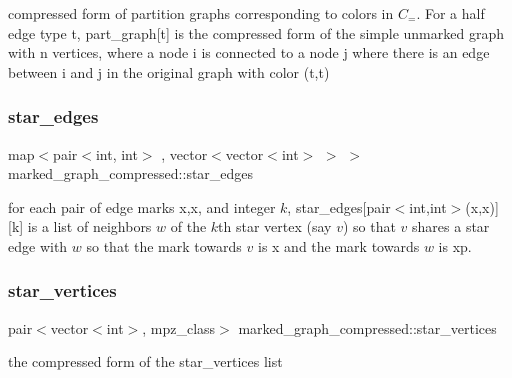 compressed form of partition graphs corresponding to colors in $C_=$. For a half edge type t, part\+\_\+graph\mbox{[}t\mbox{]} is the compressed form of the simple unmarked graph with n vertices, where a node i is connected to a node j where there is an edge between i and j in the original graph with color (t,t) 

\mbox{\label{classmarked__graph__compressed_a7df5779d313486644132bd816937f532}} 
\subsubsection{\texorpdfstring{star\+\_\+edges}{star\_edges}}
{\footnotesize\ttfamily map$<$pair$<$int, int$>$ , vector$<$vector$<$int$>$ $>$ $>$ marked\+\_\+graph\+\_\+compressed\+::star\+\_\+edges}



for each pair of edge marks x,x\textquotesingle{}, and integer $k$, star\+\_\+edges\mbox{[}pair$<$int,int$>$(x,x\textquotesingle{})\mbox{]}\mbox{[}k\mbox{]} is a list of neighbors $w$ of the $k$th star vertex (say $v$) so that $v$ shares a star edge with $w$ so that the mark towards $v$ is x and the mark towards $w$ is xp. 

\mbox{\label{classmarked__graph__compressed_a7a4ced4586e2e353f9076bd447df5208}} 
\subsubsection{\texorpdfstring{star\+\_\+vertices}{star\_vertices}}
{\footnotesize\ttfamily pair$<$vector$<$int$>$, mpz\+\_\+class$>$ marked\+\_\+graph\+\_\+compressed\+::star\+\_\+vertices}



the compressed form of the star\+\_\+vertices list 

\mbox{\label{classmarked__graph__compressed_a86b00223525703e973415cbc9c94da68}} 
